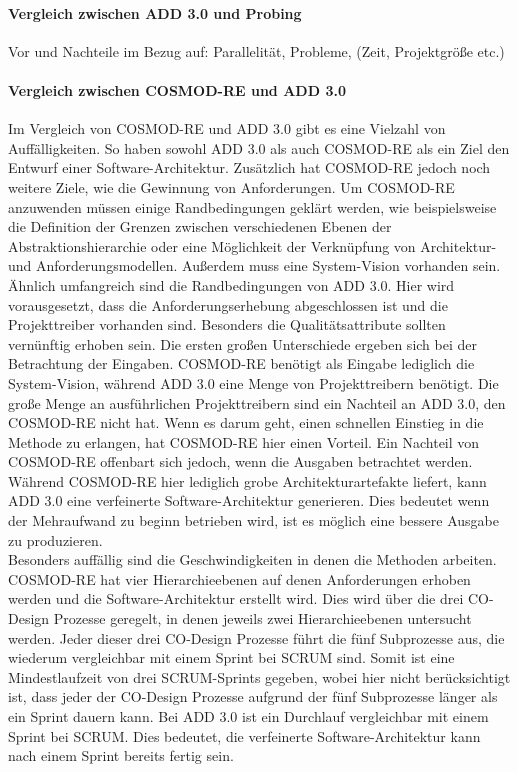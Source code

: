 \paragraph{Vergleich zwischen ADD 3.0 und Probing}
Vor und Nachteile im Bezug auf: Parallelität, Probleme, (Zeit, Projektgröße etc.)\\

\paragraph{Vergleich zwischen COSMOD-RE und ADD 3.0}
Im Vergleich von COSMOD-RE und ADD 3.0 gibt es eine Vielzahl von Auffälligkeiten. So haben sowohl ADD 3.0 als auch COSMOD-RE als ein Ziel den Entwurf einer Software-Architektur. Zusätzlich hat COSMOD-RE jedoch noch weitere Ziele, wie die Gewinnung von Anforderungen. Um COSMOD-RE anzuwenden müssen einige Randbedingungen geklärt werden, wie beispielsweise die Definition der Grenzen zwischen verschiedenen Ebenen der Abstraktionshierarchie oder eine Möglichkeit der Verknüpfung von Architektur- und Anforderungsmodellen. Außerdem muss eine System-Vision vorhanden sein. Ähnlich umfangreich sind die Randbedingungen von ADD 3.0. Hier wird vorausgesetzt, dass die Anforderungserhebung abgeschlossen ist und die Projekttreiber vorhanden sind. Besonders die Qualitätsattribute sollten vernünftig erhoben sein. Die ersten großen Unterschiede ergeben sich bei der Betrachtung der Eingaben. COSMOD-RE benötigt als Eingabe lediglich die System-Vision, während ADD 3.0 eine Menge von Projekttreibern benötigt. Die große Menge an ausführlichen Projekttreibern sind ein Nachteil an ADD 3.0, den COSMOD-RE nicht hat. Wenn es darum geht, einen schnellen Einstieg in die Methode zu erlangen, hat COSMOD-RE hier einen Vorteil. Ein Nachteil von COSMOD-RE offenbart sich jedoch, wenn die Ausgaben betrachtet werden. Während COSMOD-RE hier lediglich grobe Architekturartefakte liefert, kann ADD 3.0 eine verfeinerte Software-Architektur generieren. Dies bedeutet wenn der Mehraufwand zu beginn betrieben wird, ist es möglich eine bessere Ausgabe zu produzieren. \\

Besonders auffällig sind die Geschwindigkeiten in denen die Methoden arbeiten. COSMOD-RE hat vier Hierarchieebenen auf denen Anforderungen erhoben werden und die Software-Architektur erstellt wird. Dies wird über die drei CO-Design Prozesse geregelt, in denen jeweils zwei Hierarchieebenen untersucht werden. Jeder dieser drei CO-Design Prozesse führt die fünf Subprozesse aus, die wiederum vergleichbar mit einem Sprint bei SCRUM sind. Somit ist eine Mindestlaufzeit von drei SCRUM-Sprints gegeben, wobei hier nicht berücksichtigt ist, dass jeder der CO-Design Prozesse aufgrund der fünf Subprozesse länger als ein Sprint dauern kann. Bei ADD 3.0 ist ein Durchlauf vergleichbar mit einem Sprint bei SCRUM. Dies bedeutet, die verfeinerte Software-Architektur kann nach einem Sprint bereits fertig sein.\\

